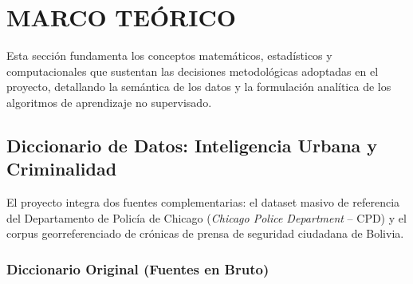 \section{MARCO TEÓRICO}

Esta sección fundamenta los conceptos matemáticos, estadísticos y computacionales que sustentan las decisiones metodológicas adoptadas en el proyecto, detallando la semántica de los datos y la formulación analítica de los algoritmos de aprendizaje no supervisado.

\subsection{Diccionario de Datos: Inteligencia Urbana y Criminalidad}

El proyecto integra dos fuentes complementarias: el dataset masivo de referencia del Departamento de Policía de Chicago (\textit{Chicago Police Department} -- CPD) y el corpus georreferenciado de crónicas de prensa de seguridad ciudadana de Bolivia.

\subsubsection{Diccionario Original (Fuentes en Bruto)}

